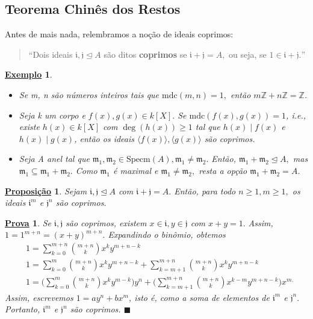 \documentclass{article}
\newtheorem*{prop*}{\underline{Proposi\c c\~ao}}
\newtheorem{example}{\underline{Exemplo}}
\newtheorem*{proof*}{\underline{Prova}}
\renewcommand\qedsymbol{$\blacksquare$}
\begin{document}
    \subsection{Teorema Chinês dos Restos}
    Antes de mais nada, relembramos a noção de ideais coprimos:
    \begin{quote}
      ``Dois ideais \(\mathfrak{i}, \mathfrak{j}\trianglelefteq{A}\) são ditos \textbf{coprimos} se \(\mathfrak{i}+\mathfrak{j} = A,\) ou seja,
      se \(1\in \mathfrak{i}+\mathfrak{j}.\)''
    \end{quote}
    \begin{example}
      \begin{itemize}
        \item[1)] Se m, n são números inteiros tais que \(\mathrm{mdc}(m, n) = 1,\) então \(m \mathbb{Z} + n \mathbb{Z} = \mathbb{Z}\).
        \item[2)] Seja k um corpo e \(f(x), g(x)\in k[X].\) Se \(\mathrm{mdc}(f(x), g(x)) = 1\), i.e.,
          existe \(h(x)\in k[X]\) com \(\deg(h(x))\geq 1\) tal que \(h(x)\mid f(x)\) e \(h(x)\mid g(x)\), então os ideais
          \(\langle f(x) \rangle, \langle g(x) \rangle\) são coprimos.
        \item[3)] Seja A anel tal que \(\mathfrak{m}_{1}, \mathfrak{m}_{2}\in \mathrm{Specm}(A), \mathfrak{m}_{1}\neq \mathfrak{m}_{2}.\) Então,
          \(\mathfrak{m}_{1} + \mathfrak{m}_{2} \trianglelefteq{A},\) mas \(\mathfrak{m}_1\subseteq \mathfrak{m}_{1}+\mathfrak{m}_{2}.\) 
          Como \(\mathfrak{m}_{1}\) é maximal e \(\mathfrak{m}_{1}\neq \mathfrak{m}_{2},\) resta a opção \(\mathfrak{m}_{1} + \mathfrak{m}_{2} = A.\)
      \end{itemize}
    \end{example}
    \begin{prop*}
      Sejam \(\mathfrak{i}, \mathfrak{j}\trianglelefteq{A}\) com \(\mathfrak{i}+\mathfrak{j} = A.\) Então, para todo \(n\geq 1, m\geq 1,\) os ideais
      \(\mathfrak{i}^{m}\) e \(\mathfrak{j}^{n}\) são coprimos.
    \end{prop*}
    \begin{proof*}
      Se \(\mathfrak{i}, \mathfrak{j}\) são coprimos, existem \(x\in \mathfrak{i}, y\in \mathfrak{j}\) com \(x+y = 1.\)
      Assim, \(1 = 1^{m+n} = (x+y)^{m+n}.\) Expandindo o binômio, obtemos
      \begin{align*}
  &1 = \sum\limits_{k=0}^{m+n}\binom{m+n}{k}x^{k}y^{m+n-k}\\
  &1 = \sum\limits_{k=0}^{m}\binom{m+n}{k}x^{k}y^{m+n-k} + \sum\limits_{k=m+1}^{m+n}\binom{m+n}{k}x^{k}y^{m+n-k}\\
  &1 = \biggl(\sum\limits_{k=0}^{m}\binom{m+n}{k}x^{k}y^{m-k}\biggr)y^{n}+\biggl(\sum\limits_{k=m+1}^{m+n}\binom{m+n}{k}x^{k-m}y^{m+n-k}\biggr)x^{m.}
      \end{align*}
      Assim, escrevemos \(1 = ay^{n}+bx^{m}\), isto é, como a soma de elementos de \(\mathfrak{i}^{m}\) e \(\mathfrak{j}^{n}.\) Portanto,
      \(\mathfrak{i}^{m}\) e \(\mathfrak{j}^{n}\) são coprimos. \qedsymbol
    \end{proof*}
\end{document}
